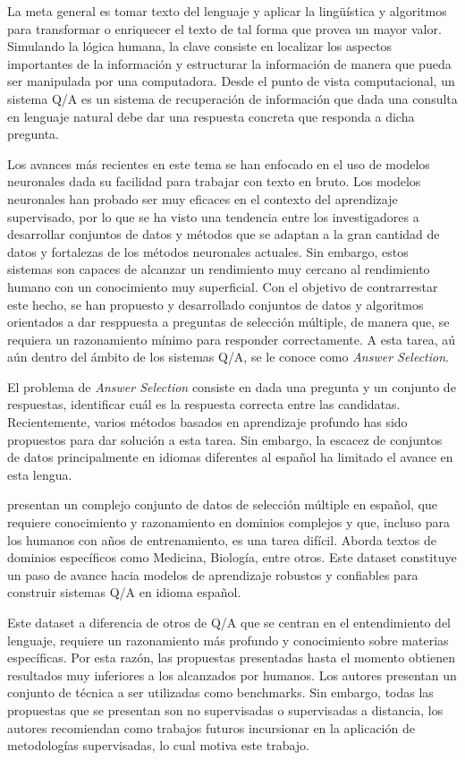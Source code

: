 La meta general es tomar texto del lenguaje y aplicar la lingüística y algoritmos para transformar o enriquecer el texto de tal forma que provea un mayor valor. Simulando la lógica humana, la clave consiste en localizar los aspectos importantes de la información y estructurar la información de manera que pueda ser manipulada por una computadora. Desde el punto de vista computacional, un sistema Q/A es un sistema de recuperación de información que dada una consulta en lenguaje natural debe dar una respuesta concreta que responda a dicha pregunta. 

Los avances más recientes en este tema se han enfocado en el uso de modelos neuronales dada su facilidad para trabajar con texto en bruto. Los modelos neuronales han probado ser muy eficaces en el contexto del aprendizaje supervisado, por lo que se ha visto una tendencia entre los investigadores a desarrollar conjuntos de datos y métodos que se adaptan a la gran cantidad de datos y fortalezas de los métodos neuronales actuales. Sin embargo, estos sistemas son capaces de alcanzar un rendimiento muy cercano al rendimiento humano con un conocimiento muy superficial. Con el objetivo de contrarrestar este hecho, se han propuesto y desarrollado conjuntos de datos y algoritmos orientados a dar resppuesta a preguntas de selección múltiple, de manera que, se requiera un razonamiento mínimo para responder correctamente. A esta tarea, aú aún dentro del ámbito de los sistemas Q/A, se le conoce como \textit{Answer Selection}. 

El problema de \textit{Answer Selection} consiste en dada una pregunta y un conjunto de respuestas, identificar cuál es la respuesta correcta entre las candidatas. Recientemente, varios métodos basados en aprendizaje profundo has sido propuestos para dar solución a esta tarea. Sin embargo, la escacez de conjuntos de datos principalmente en idiomas diferentes al español ha limitado el avance en esta lengua. 

\cite{2019-head-qa} presentan un complejo conjunto de datos de selección múltiple en español, que requiere conocimiento y razonamiento en dominios complejos y que, incluso para los humanos con años de entrenamiento, es una tarea difícil. Aborda textos de dominios específicos como Medicina, Biología, entre otros. Este dataset constituye un paso de avance hacia modelos de aprendizaje robustos y confiables para construir sistemas Q/A en idioma español. 

Este dataset a diferencia de otros de Q/A que se centran en el entendimiento del lenguaje, requiere un razonamiento más profundo y conocimiento sobre materias específicas. Por esta razón, las propuestas presentadas hasta el momento obtienen resultados muy inferiores a los alcanzados por humanos. Los autores presentan un conjunto de técnica a ser utilizadas como benchmarks. Sin embargo, todas las propuestas que se presentan son no supervisadas o supervisadas a distancia, los autores recomiendan como trabajos futuros incursionar en la aplicación de metodologías supervisadas, lo cual motiva este trabajo.

